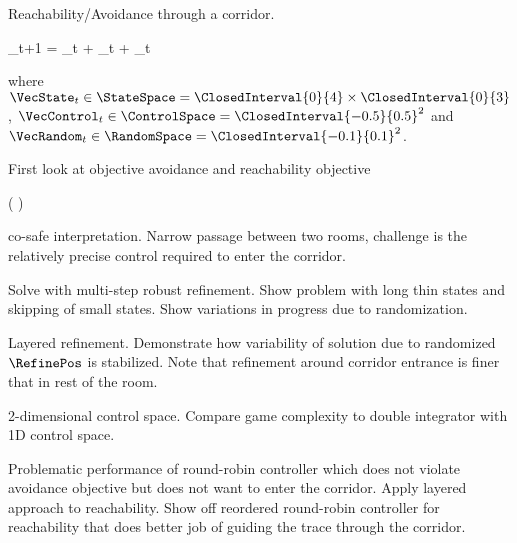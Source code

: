 Reachability/Avoidance through a corridor.

\startformula
    \VecX_{t+1} =  \VecState_{t} +  \VecControl_{t} + \VecRandom_{t} \EndComma
\stopformula

where $\VecState_{t} \in \StateSpace = \ClosedInterval{0}{4} \times \ClosedInterval{0}{3}$, $\VecControl_{t} \in \ControlSpace = \ClosedInterval{-0.5}{0.5}^2$ and $\VecRandom_{t} \in \RandomSpace = \ClosedInterval{-0.1}{0.1}^2$.

\startsubsection[title={Reachability Analysis}]

    First look at objective avoidance and reachability objective

    \startformula
        ( \neg \pi ) \Until \varphi
    \stopformula

    co-safe interpretation.
    Narrow passage between two rooms, challenge is the relatively precise control required to enter the corridor.

    Solve with multi-step robust refinement.
    Show problem with long thin states and skipping of small states.
    Show variations in progress due to randomization.

    Layered refinement.
    Demonstrate how variability of solution due to randomized $\RefinePos$ is stabilized.
    Note that refinement around corridor entrance is finer that in rest of the room.

    2-dimensional control space.
    Compare game complexity to double integrator with 1D control space.

\stopsubsection


\startsubsection[title={Reachability Controller}]

    Problematic performance of round-robin controller which does not violate avoidance objective but does not want to enter the corridor.
    Apply layered approach to reachability.
    Show off reordered round-robin controller for reachability that does better job of guiding the trace through the corridor.

\stopsubsection


